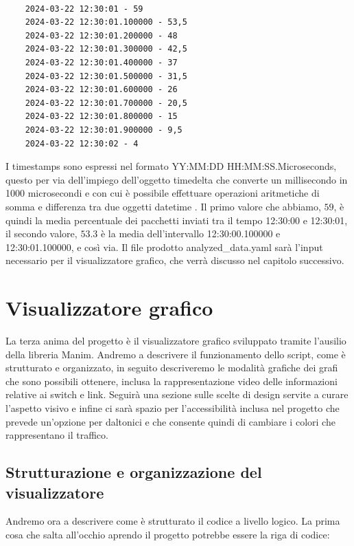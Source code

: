 \documentclass[binding=0.6cm]{sapthesis}
\begin{document}
{\scriptsize %
\begin{lstlisting}[caption={timestamps e medie percentuali calcolate dall'analizzatore}, label={codice:analyzed_data_structure}]

    2024-03-22 12:30:01 - 59
    2024-03-22 12:30:01.100000 - 53,5
    2024-03-22 12:30:01.200000 - 48
    2024-03-22 12:30:01.300000 - 42,5
    2024-03-22 12:30:01.400000 - 37
    2024-03-22 12:30:01.500000 - 31,5
    2024-03-22 12:30:01.600000 - 26
    2024-03-22 12:30:01.700000 - 20,5
    2024-03-22 12:30:01.800000 - 15
    2024-03-22 12:30:01.900000 - 9,5
    2024-03-22 12:30:02 - 4

\end{lstlisting}
}
I timestamps sono espressi nel formato YY:MM:DD HH:MM:SS.Microseconds, questo per via dell'impiego dell'oggetto timedelta \cite{pythonDatetimeTimedelta} che converte un millisecondo in 1000 microsecondi e con cui è possibile effettuare
operazioni aritmetiche di somma e differenza tra due oggetti datetime \cite{pythonDatetimeTimedelta}.
Il primo valore che abbiamo, \(59\), è quindi la media percentuale dei pacchetti inviati tra il tempo 12:30:00 e 12:30:01, il secondo valore, \(53.3\) è la media
dell'intervallo 12:30:00.100000 e 12:30:01.100000, e così via.
Il file prodotto analyzed\_data.yaml sarà l'input necessario per il visualizzatore grafico, che verrà discusso nel capitolo successivo.

\chapter{Visualizzatore grafico}
La terza anima del progetto è il visualizzatore grafico sviluppato tramite l'ausilio della libreria Manim. Andremo a descrivere il funzionamento dello script,
come è strutturato e organizzato, in seguito descriveremo le modalità grafiche dei grafi che sono possibili ottenere, inclusa la rappresentazione video
delle informazioni relative ai switch e link. Seguirà una sezione sulle scelte di design servite a curare l'aspetto visivo e infine ci sarà spazio
per l'accessibilità inclusa nel progetto che prevede un'opzione per daltonici e che consente quindi di cambiare i colori che rappresentano il traffico.

\section{Strutturazione e organizzazione del visualizzatore}
\label{sec:strutturazione_visualizzatore}
Andremo ora a descrivere come è strutturato il codice a livello logico. La prima cosa che salta all'occhio aprendo il progetto potrebbe essere la riga di codice:
\end{document}
